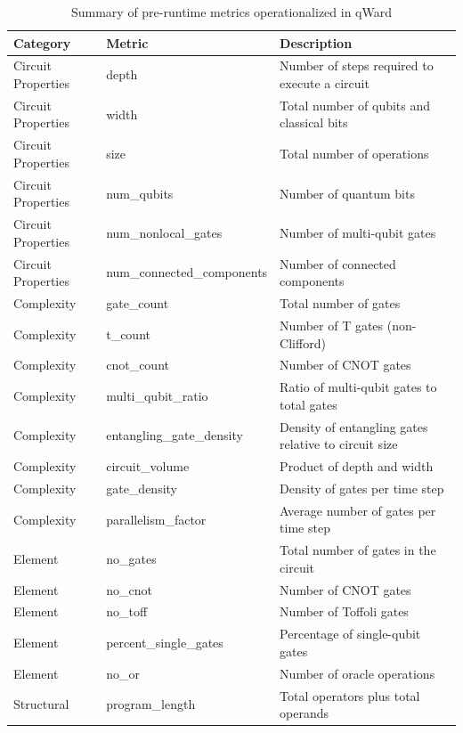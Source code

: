 \documentclass{article}
\begin{document}
\begin{table}[htbp]
\renewcommand{\arraystretch}{1.3}
\centering
\caption{Summary of pre-runtime metrics operationalized in qWard}
\label{tab:preruntime-summary}
\footnotesize
\begin{tabular}{|l|l|p{5.6cm}|}
\hline
\textbf{Category} & \textbf{Metric} & \textbf{Description} \\
\hline
Circuit Properties & depth & Number of steps required to execute a circuit \\
\hline
Circuit Properties & width & Total number of qubits and classical bits \\
\hline
Circuit Properties & size & Total number of operations \\
\hline
Circuit Properties & num\_qubits & Number of quantum bits \\
\hline
Circuit Properties & num\_nonlocal\_gates & Number of multi-qubit gates \\
\hline
Circuit Properties & num\_connected\_components & Number of connected components \\
\hline
Complexity & gate\_count & Total number of gates \\
\hline
Complexity & t\_count & Number of T gates (non-Clifford) \\
\hline
Complexity & cnot\_count & Number of CNOT gates \\
\hline
Complexity & multi\_qubit\_ratio & Ratio of multi-qubit gates to total gates \\
\hline
Complexity & entangling\_gate\_density & Density of entangling gates relative to circuit size \\
\hline
Complexity & circuit\_volume & Product of depth and width \\
\hline
Complexity & gate\_density & Density of gates per time step \\
\hline
Complexity & parallelism\_factor & Average number of gates per time step \\
\hline
Element & no\_gates & Total number of gates in the circuit \\
\hline
Element & no\_cnot & Number of CNOT gates \\
\hline
Element & no\_toff & Number of Toffoli gates \\
\hline
Element & percent\_single\_gates & Percentage of single-qubit gates \\
\hline
Element & no\_or & Number of oracle operations \\
\hline
Structural & program\_length & Total operators plus total operands \\

\end{tabular}
\end{table}
\end{document}
